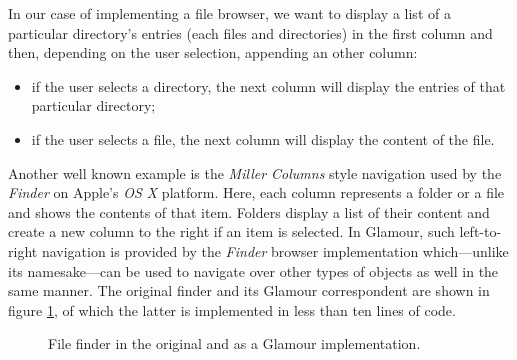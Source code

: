 \documentclass[a4paper,10pt,twoside]{book}
\begin{document}
In our case of implementing a file browser, we want to display a list
of a particular directory's entries (each files and directories) in
the first column and then, depending on the user selection, appending
an other column:

\begin{itemize}
\item if the user selects a directory, the next column will display
  the entries of that particular directory;
\item if the user selects a file, the next column will display the
  content of the file.
\end{itemize}


 Another well known example is the \emph{Miller Columns} style navigation used by the \emph{Finder} on Apple's \emph{OS X} platform. Here, each column represents a folder or a file and shows the contents of that item. Folders display a list of their content and create a new column to the right if an item is selected. In Glamour, such left-to-right navigation is provided by the \emph{Finder} browser implementation which---unlike its namesake---can be used to navigate over other types of objects as well in the same manner. The original finder and its Glamour correspondent are shown in figure \ref{fig:casestudies/file_finder}, of which the latter is implemented in less than ten lines of code.

\begin{figure}[tbp]
\begin{center}
\caption{File finder in the original and as a Glamour implementation.}
\label{fig:casestudies/file_finder}
\end{center}
\end{figure}
\end{document}
